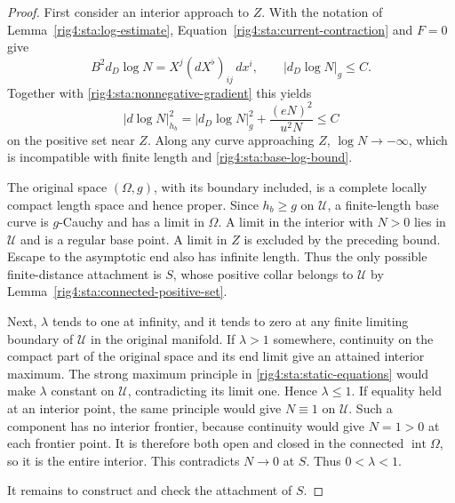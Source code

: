 \begin{proof}
First consider an interior approach to $Z$. With the notation of
Lemma~\ref{rig4:sta:log-estimate}, Equation~\eqref{rig4:sta:current-contraction}
and $F=0$ give
\[
 B^2d_D\log N=X^j(dX^\flat)_{ij}\,dx^i,
 \qquad |d_D\log N|_g\le C.
\]
Together with \eqref{rig4:sta:nonnegative-gradient} this yields
\begin{equation}\label{rig4:sta:base-log-bound}
 |d\log N|_{h_b}^2
 =|d_D\log N|_g^2+\frac{(eN)^2}{u^2N}\le C
\end{equation}
on the positive set near $Z$. Along any curve approaching $Z$,
$\log N\to-\infty$, which is incompatible with finite length and
\eqref{rig4:sta:base-log-bound}.

The original space $(\Omega,g)$, with its boundary included, is a
complete locally compact length space and hence proper. Since
$h_b\ge g$ on $\mathcal U$, a finite-length base curve is $g$-Cauchy
and has a limit in $\Omega$. A limit in the interior with $N>0$ lies
in $\mathcal U$ and is a regular base point. A limit in $Z$ is
excluded by the preceding bound. Escape to the asymptotic end also
has infinite length. Thus the only possible finite-distance
attachment is $S$, whose positive collar belongs to $\mathcal U$
by Lemma~\ref{rig4:sta:connected-positive-set}.

Next, $\lambda$ tends to one at infinity, and it tends to zero at
any finite limiting boundary of $\mathcal U$ in the original
manifold. If $\lambda>1$ somewhere, continuity on the compact part
of the original space and its end limit give an attained interior
maximum. The strong maximum principle in
\eqref{rig4:sta:static-equations} would make $\lambda$ constant on
$\mathcal U$, contradicting its limit one. Hence $\lambda\le1$.
If equality held at an interior point, the same principle would
give $N\equiv1$ on $\mathcal U$. Such a component has no interior
frontier, because continuity would give $N=1>0$ at each frontier
point. It is therefore both open and closed in the connected
$\operatorname{int}\Omega$, so it is the entire interior. This
contradicts $N\to0$ at $S$. Thus $0<\lambda<1$.

It remains to construct and check the attachment of $S$.


\end{proof}
